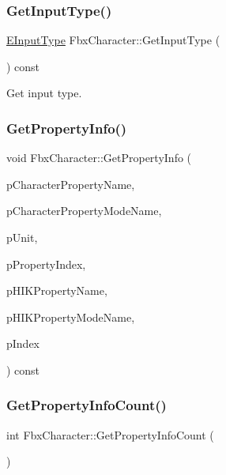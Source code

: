 \subsubsection{\texorpdfstring{Get\+Input\+Type()}{GetInputType()}}
{\footnotesize\ttfamily \hyperlink{class_fbx_character_a0c2ca4f8cab9c76a83b0e207f3ae8ea1}{E\+Input\+Type} Fbx\+Character\+::\+Get\+Input\+Type (\begin{DoxyParamCaption}{ }\end{DoxyParamCaption}) const}



Get input type. 

\mbox{\label{class_fbx_character_a49f3d9530d72a1ab268aa500ef64ac3e}} 
\subsubsection{\texorpdfstring{Get\+Property\+Info()}{GetPropertyInfo()}}
{\footnotesize\ttfamily void Fbx\+Character\+::\+Get\+Property\+Info (\begin{DoxyParamCaption}\item[{char $\ast$\&}]{p\+Character\+Property\+Name,  }\item[{char $\ast$\&}]{p\+Character\+Property\+Mode\+Name,  }\item[{\hyperlink{class_fbx_character_aa48fb13a1c63e6a69ce9fa251993f8d5}{E\+Property\+Unit} \&}]{p\+Unit,  }\item[{int \&}]{p\+Property\+Index,  }\item[{char $\ast$\&}]{p\+H\+I\+K\+Property\+Name,  }\item[{char $\ast$\&}]{p\+H\+I\+K\+Property\+Mode\+Name,  }\item[{int}]{p\+Index }\end{DoxyParamCaption}) const}

\mbox{\label{class_fbx_character_a4d3213a482478fa8c8ad242dc76e9e96}} 
\subsubsection{\texorpdfstring{Get\+Property\+Info\+Count()}{GetPropertyInfoCount()}}
{\footnotesize\ttfamily int Fbx\+Character\+::\+Get\+Property\+Info\+Count (\begin{DoxyParamCaption}{ }\end{DoxyParamCaption})}

